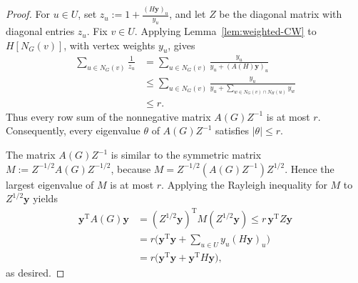 \documentclass[11pt]{article}
\theoremstyle{plain}
\theoremstyle{definition}
\numberwithin{equation}{section}
\begin{document}
\begin{proof}
For $u\in U$, set $z_u:= 1 + \frac{(H\bm{y})_u}{y_u}$,
and let $Z$ be the diagonal matrix with diagonal entries $z_u$.  Fix
$v\in U$. Applying Lemma~\ref{lem:weighted-CW} to $H[N_G(v)]$, with vertex
weights $y_u$, gives
\begin{align}
\sum_{u\in N_G(v)} \frac{1}{z_u}
& = \sum_{u\in N_G(v)} \frac{y_u}{y_u+(A(H) \bm{y})_u} \nonumber \\
& \leq \sum_{u\in N_G(v)} \frac{y_u}{y_u + \sum_{w\in N_G(v)\cap N_H(u)} y_w} \nonumber \\
& \leq r. \label{eq:rows}
\end{align}
Thus every row sum of the nonnegative matrix $A(G) Z^{-1}$ is at most $r$.
Consequently, every eigenvalue $\theta$ of $A(G)Z^{-1}$ satisfies
$|\theta|\leq r$.  

The matrix $A(G)Z^{-1}$ is similar to the symmetric matrix
$M:= Z^{-1/2}A(G)Z^{-1/2}$, because $M=Z^{-1/2}(A(G)Z^{-1})Z^{1/2}$.  
Hence the largest eigenvalue of $M$ is at most $r$. Applying the Rayleigh 
inequality for $M$ to $Z^{1/2} \bm{y}$ yields
\begin{align*}
\bm{y}^{\mathrm{T}} A(G)\bm{y}
& = (Z^{1/2} \bm{y})^{\mathrm{T}} M(Z^{1/2}\bm{y})\leq r\,\bm{y}^{\mathrm{T}} Z \bm{y} \\
& = r\bigg(\bm{y}^{\mathrm{T}} \bm{y} + \sum_{u\in U} y_u (H\bm{y})_u\bigg) \\
& = r\big(\bm{y}^{\mathrm{T}} \bm{y} + \bm{y}^{\mathrm{T}} H\bm{y}\big),
\end{align*}
as desired.
\end{proof}
\end{document}
